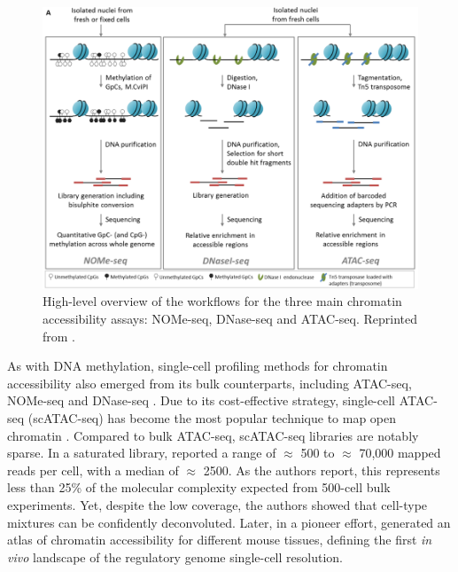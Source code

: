 \begin{figure}[H]
	\centering
	\includegraphics[width=0.8\linewidth]{ChromatinAcc_protocols}
	\caption[]{High-level overview of the workflows for the three main chromatin accessibility assays: NOMe-seq, DNase-seq and ATAC-seq. Reprinted from \cite{Nordstrom2019}. }
	\label{fig:ChromatinAcc_protocols}
\end{figure}

As with DNA methylation, single-cell profiling methods for chromatin accessibility also emerged from its bulk counterparts, including ATAC-seq\cite{Buenrostro2015a}, NOMe-seq \cite{Pott2016} and DNase-seq \cite{Jin2015}. Due to its cost-effective strategy, single-cell ATAC-seq (scATAC-seq) has become the most popular technique to map open chromatin \cite{Cusanovich2015,Cao2018,Chen2018}. Compared to bulk ATAC-seq, scATAC-seq libraries are notably sparse. In a saturated library, \cite{Cusanovich2015} reported a range of $\approx$ 500 to $\approx$ 70,000 mapped reads per cell, with a median of $\approx$ 2500. As the authors report, this represents less than 25\% of the molecular complexity expected from 500-cell bulk experiments. Yet, despite the low coverage, the authors showed that cell-type mixtures can be confidently deconvoluted. Later, in a pioneer effort, \cite{Cusanovich2018b} generated an atlas of chromatin accessibility for different mouse tissues, defining the first \textit{in vivo} landscape of the regulatory genome single-cell resolution.



